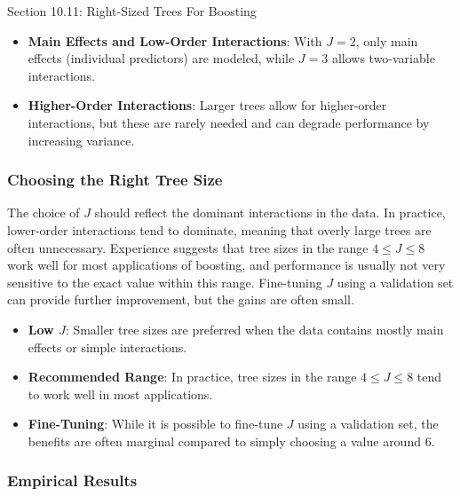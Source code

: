 \begin{notes}{Section 10.11: Right-Sized Trees For Boosting}
    \begin{highlight}
        \begin{itemize}
            \item \textbf{Main Effects and Low-Order Interactions}: With $J = 2$, only main effects (individual predictors) are modeled, while $J = 3$ allows two-variable interactions.
            \item \textbf{Higher-Order Interactions}: Larger trees allow for higher-order interactions, but these are rarely needed and can degrade performance by increasing variance.
        \end{itemize}
    \end{highlight}
    
    \subsubsection*{Choosing the Right Tree Size}
    
    The choice of $J$ should reflect the dominant interactions in the data. In practice, lower-order interactions tend to dominate, meaning that overly large trees are often unnecessary. Experience suggests 
    that tree sizes in the range $4 \leq J \leq 8$ work well for most applications of boosting, and performance is usually not very sensitive to the exact value within this range. Fine-tuning $J$ using 
    a validation set can provide further improvement, but the gains are often small.
    
    \begin{highlight}
        \begin{itemize}
            \item \textbf{Low $J$}: Smaller tree sizes are preferred when the data contains mostly main effects or simple interactions.
            \item \textbf{Recommended Range}: In practice, tree sizes in the range $4 \leq J \leq 8$ tend to work well in most applications.
            \item \textbf{Fine-Tuning}: While it is possible to fine-tune $J$ using a validation set, the benefits are often marginal compared to simply choosing a value around 6.
        \end{itemize}
    \end{highlight}
    
    \subsubsection*{Empirical Results}
    

\end{notes}
